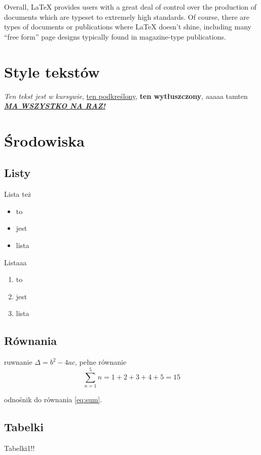 \documentclass{article}
\begin{document}
Overall, LaTeX provides users with a great deal of control over the production of documents which are typeset to extremely high standards. Of course, there are types of documents or publications where LaTeX doesn’t shine, including many “free form” page designs typically found in magazine-type publications.

\section{Style tekstów}

\textit{Ten tekst jest w kursywie}, \underline{ten podkreślony}, \textbf{ten wytłuszczony}, aaaaa tamten \textbf{\textit{\underline{MA WSZYSTKO NA RAZ!}}}

\section{Środowiska}

\subsection{Listy}

Lista też
\begin{itemize}
    \item to
    \item jest
    \item lista
\end{itemize}

Listaaa

\begin{enumerate}
    \item to
    \item jest
    \item lista
\end{enumerate}

\subsection{Równania}
ruwnanie $\Delta = b^2 - 4ac $, pełne równanie
\[
\sum_{n=1}^{5} n = 1 + 2 + 3 + 4 + 5 = 15 \label{eq:sum}
\]

odnośnik do równania \ref{eq:sum}.

\subsection{Tabelki}

Tabelki1!!
\end{document}
